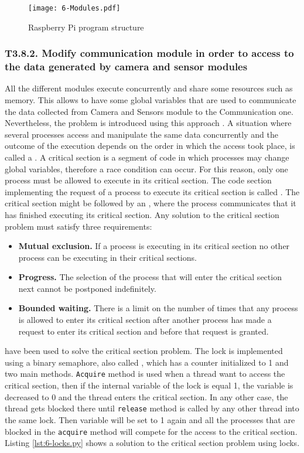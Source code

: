 \begin{figure}[!h]
	\begin{center}
		\texttt{[image: 6-Modules.pdf]}
		\caption{Raspberry Pi program structure}
		\label{fig:6-Modules}
	\end{center}
\end{figure}


\subsubsection{T3.8.2. Modify communication module in order to access to the data generated by camera and sensor modules}
All the different modules execute concurrently and share some resources such as memory. This allows to have some global variables that are used to communicate the data collected from Camera and Sensors module to the Communication one. Nevertheless, the  problem is introduced using this approach \cite{SGG06}. A situation where several processes access and manipulate the same data concurrently and the outcome of the execution depends on the order in which the access took place, is called a . A critical section is a segment of code in which processes may change global variables, therefore a race condition can occur. For this reason, only one process must be allowed to execute in its critical section. The code section implementing the request of a process to execute its critical section is called . The critical section might be followed by an , where the process communicates that it has finished executing its critical section. Any solution to the critical section problem must satisfy three requirements:
\begin{itemize}
	\item \textbf{Mutual exclusion.} If a process is executing in its critical section no other process can be executing in their critical sections.
	\item \textbf{Progress.} The selection of the process that will enter the critical section next cannot be postponed indefinitely.
	\item \textbf{Bounded waiting.} There is a limit on the number of times that any process is allowed to enter its critical section after another process has made a request to enter its critical section and before that request is granted.
\end{itemize}

 have been used to solve the critical section problem. The lock is implemented using a binary semaphore, also called , which has a counter initialized to 1 and two main methods. \texttt{Acquire} method is used when a thread want to access the critical section, then if the internal variable of the lock is equal 1, the variable is decreased to 0 and the thread enters the critical section. In any other case, the thread gets blocked there until \texttt{release} method is called by any other thread into the same lock. Then variable will be set to 1 again and all the processes that are blocked in the \texttt{acquire} method will compete for the access to the critical section. Listing \ref{lst:6-locks.py} shows a solution to the critical section problem using locks.

